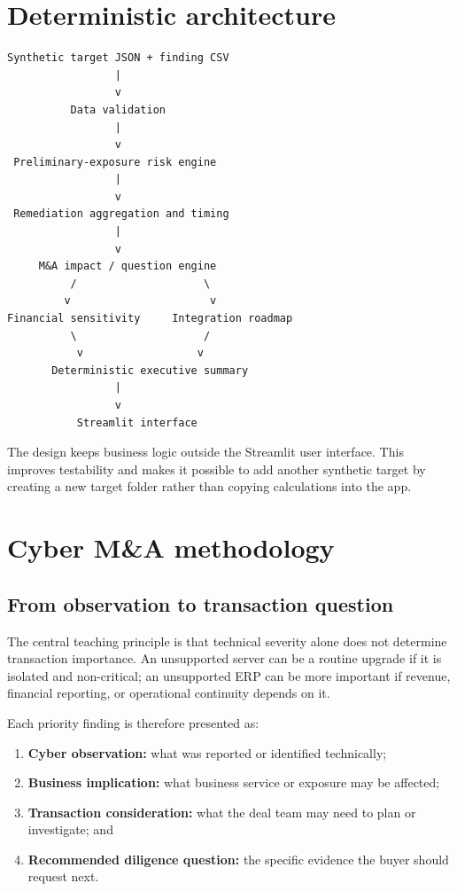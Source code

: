 \documentclass[11pt,a4paper]{article}
\begin{document}
\section{Deterministic architecture}

\begin{verbatim}
Synthetic target JSON + finding CSV
                 |
                 v
          Data validation
                 |
                 v
 Preliminary-exposure risk engine
                 |
                 v
 Remediation aggregation and timing
                 |
                 v
     M&A impact / question engine
          /                    \
         v                      v
Financial sensitivity     Integration roadmap
          \                    /
           v                  v
       Deterministic executive summary
                 |
                 v
           Streamlit interface
\end{verbatim}

The design keeps business logic outside the Streamlit user interface. This improves testability and makes it possible to add another synthetic target by creating a new target folder rather than copying calculations into the app.

\section{Cyber M\&A methodology}

\subsection{From observation to transaction question}

The central teaching principle is that technical severity alone does not determine transaction importance. An unsupported server can be a routine upgrade if it is isolated and non-critical; an unsupported ERP can be more important if revenue, financial reporting, or operational continuity depends on it.

Each priority finding is therefore presented as:

\begin{enumerate}
  \item \textbf{Cyber observation:} what was reported or identified technically;
  \item \textbf{Business implication:} what business service or exposure may be affected;
  \item \textbf{Transaction consideration:} what the deal team may need to plan or investigate; and
  \item \textbf{Recommended diligence question:} the specific evidence the buyer should request next.
\end{enumerate}
\end{document}
